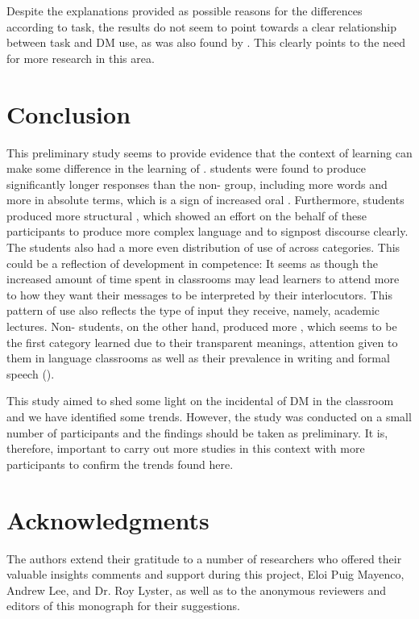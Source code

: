 \documentclass[output=paper]{langsci/langscibook}
\begin{document}
Despite the explanations provided as possible reasons for the differences according to task, the results do not seem to point towards a clear relationship between task and DM use, as was also found by \citet{Neary-Sundquist2013}. This clearly points to the need for more research in this area.


\section{Conclusion}
\largerpage
This preliminary study seems to provide evidence that the context of learning can make some difference in the learning of .  students were found to produce significantly longer responses than the non- group, including more words and more  in absolute terms, which is a sign of increased oral . Furthermore,  students produced more structural , which showed an effort on the behalf of these participants to produce more complex language and to signpost discourse clearly. The  students also had a more even distribution of use of  across categories. This could be a reflection of development in  competence: It seems as though the increased amount of time spent in  classrooms may lead learners to attend more to how they want their messages to be interpreted by their interlocutors. This pattern of use also reflects the type of input they receive, namely, academic lectures. Non- students, on the other hand, produced more  , which seems to be the first category learned due to their transparent meanings, attention given to them in language classrooms as well as their prevalence in writing and formal speech (\citealt{FungCarter2007,Neary-Sundquist2014,Liu2016}). 

This study aimed to shed some light on the incidental  of DM in the  classroom and we have identified some trends. However, the study was conducted on a small number of participants and the findings should be taken as preliminary. It is, therefore, important to carry out more studies in this context with more participants to confirm the trends found here. 

\section*{Acknowledgments}

The authors extend their gratitude to a number of researchers who offered their valuable insights comments and support during this project, Eloi Puig Mayenco, Andrew Lee, and Dr. Roy Lyster, as well as to the anonymous reviewers and editors of this monograph for their suggestions.
\end{document}
